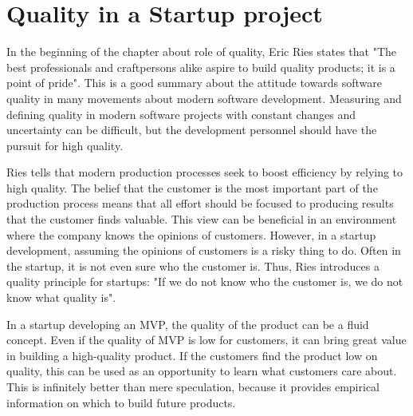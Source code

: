 


 \section{Quality in a Startup project}

In the beginning of the chapter about role of quality, Eric Ries states that "The best professionals and craftpersons alike aspire to build quality products; it is a point of pride". This is a good summary about the attitude towards software quality in many movements about modern software development. Measuring and defining quality in modern software projects with constant changes and uncertainty can be difficult, but the development personnel should have the pursuit for high quality.

Ries tells that modern production processes seek to boost efficiency by relying to high quality. The belief that the customer is the most important part of the production process means that all effort should be focused to producing results that the customer finds valuable. This view can be beneficial in an environment where the company knows the opinions of customers. However, in a startup development, assuming the opinions of customers is a risky thing to do. Often in the startup, it is not even sure who the customer is. Thus, Ries introduces a quality principle for startups: "If we do not know who the customer is, we do not know what quality is".

In a startup developing an MVP, the quality of the product can be a fluid concept. Even if the quality of MVP is low for customers, it can bring great value in building a high-quality product. If the customers find the product low on quality, this can be used as an opportunity to learn what customers care about. This is infinitely better than mere speculation, because it provides empirical information on which to build future products.

